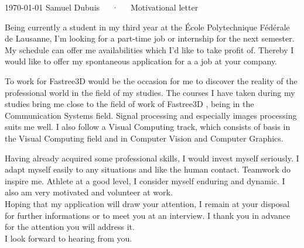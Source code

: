 \documentclass[12pt, a4paper]{awesome-cv}
\newcommand{\companyName}{Fastree3D }
\begin{document}
\makecvheader[C]

\makecvfooter
{\today}
{Samuel Dubuis~~~·~~~Motivational letter}
{}

\makelettertitle

\begin{cvletter}

	Being currently a student in my third year at the École Polytechnique Fédérale de Lausanne, I'm looking for a part-time job or internship for the next semester. My schedule can offer me availabilities which I'd like to take profit of. Thereby I would like to offer my spontaneous application for a a job at your company.

	\lettersection{Why \companyName	?}
	To work for \companyName would be the occasion for me to discover the reality of the professional world in the field of my studies.
	The courses I have taken during my studies bring me close to the field of work of \companyName, being in the Communication Systems field. Signal processing and especially images processing suits me well. I also follow a Visual Computing track, which consists of basis in the Visual Computing field and in Computer Vision and Computer Graphics.

	Having already acquired some professional skills, I would invest myself seriously. I adapt myself easily to any situations and like the human contact. Teamwork do inspire me. Athlete at a good level, I consider myself enduring and dynamic. I also am very motivated and volunteer at work. \\
	Hoping that my application will draw your attention, I remain at your disposal for further informations or to meet you at an interview. I thank you in advance for the attention you will address it. \\
	I look forward to hearing from you.

\end{cvletter}


\makeletterclosing
\end{document}
